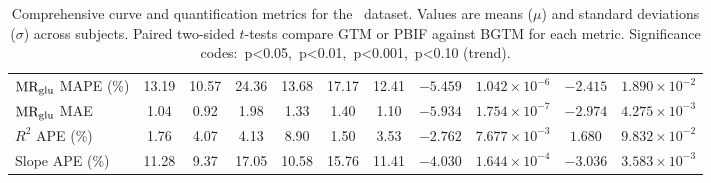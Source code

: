 \begin{sidewaystable}[b]
\begin{tabular}{l|cc|cc|cc|cc|cc}
		\midrule
		\(\text{MR}_{\text{glu}}\) MAPE (\%)             & 13.19                              & 10.57                             & 24.36                              & 13.68                                     & 17.17                                     & 12.41      & \(-5.459\) & \(1.042\times 10^{-6}\) \sym{***}  & \(-2.415\) & \(1.890\times 10^{-2}\) \sym{*}    \\
		\(\text{MR}_{\text{glu}}\) MAE                   & 1.04                               & 0.92                              & 1.98                               & 1.33                                      & 1.40                                      & 1.10       & \(-5.934\) & \(1.754\times 10^{-7}\) \sym{***}  & \(-2.974\) & \(4.275\times 10^{-3}\) \sym{**}   \\
		\(R^2\) APE (\%)                 & 1.76                               & 4.07                              & 4.13                               & 8.90                                      & 1.50                                      & 3.53       & \(-2.762\) & \(7.677\times 10^{-3}\) \sym{**}   & \(1.680\)  & \(9.832\times 10^{-2}\)            \\
		Slope APE (\%)                   & 11.28                              & 9.37                              & 17.05                              & 10.58                                     & 15.76                                     & 11.41      & \(-4.030\) & \(1.644\times 10^{-4}\) \sym{***}  & \(-3.036\) & \(3.583\times 10^{-3}\) \sym{**}   \\
		\bottomrule
	\end{tabular}
	\caption{Comprehensive curve and quantification metrics for the \fdg\ dataset.
		Values are means (\(\mu\)) and standard deviations (\(\sigma\)) across subjects.
		Paired two-sided \(t\)-tests compare GTM or PBIF against BGTM for each metric.
		Significance codes: \sym{*}\,p<0.05, \sym{**}\,p<0.01, \sym{***}\,p<0.001, \sym{\dag}\,p<0.10 (trend).}

	\label{tab:metrics_all_fdg}
\end{sidewaystable}
